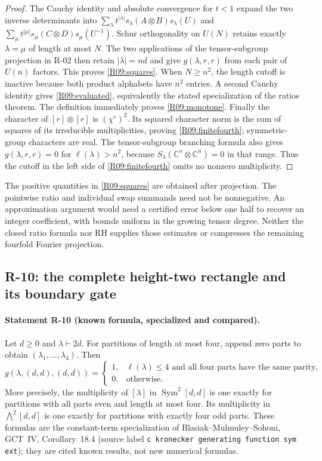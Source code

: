 \begin{proof}
The Cauchy identity and absolute convergence for $t<1$ expand the two
inverse determinants into
$\sum_\lambda t^{|\lambda|}s_\lambda(A\otimes B)s_\lambda(U)$
and
$\sum_\mu t^{|\mu|}s_\mu(C\otimes D)s_\mu(U^{-1})$.
Schur orthogonality on $U(N)$ retains exactly $\lambda=\mu$ of
length at most $N$. The two applications of the tensor-subgroup
projection in R-02 then retain $|\lambda|=nd$ and give
$g(\lambda,r,r)$ from each pair of $U(n)$ factors. This proves
\eqref{R09:squares}. When $N\geq n^2$, the length cutoff is
inactive because both product alphabets have $n^2$ entries. A second
Cauchy identity gives \eqref{R09:evaluated}, equivalently the stated
specialization of the ratios theorem. The definition immediately
proves \eqref{R09:monotone}. Finally the character of
$[r]\otimes[r]$ is $(\chi^r)^2$. Its squared character norm is
the sum of squares of its irreducible multiplicities, proving
\eqref{R09:finitefourth}; symmetric-group characters are real.
The tensor-subgroup branching formula also gives
$g(\lambda,r,r)=0$ for $\ell(\lambda)>n^2$, because
$S_\lambda(\mathbb C^n\otimes\mathbb C^n)=0$ in that range.
Thus the cutoff in the left side of \eqref{R09:finitefourth}
omits no nonzero multiplicity.
\end{proof}

The positive quantities in \eqref{R09:squares} are obtained after
projection. The pointwise ratio and individual swap summands need
not be nonnegative. An approximation argument would need a
certified error below one half to recover an integer coefficient,
with bounds uniform in the growing tensor degree. Neither the
closed ratio formula nor RH supplies those estimates or compresses
the remaining fourfold Fourier projection.

\subsection{R-10: the complete height-two rectangle and its boundary gate}

\paragraph{Statement R-10 (known formula, specialized and compared).}
Let $d\geq0$ and $\lambda\vdash2d$. For partitions of length at
most four, append zero parts to obtain $(\lambda_1,\ldots,\lambda_4)$.
Then
\begin{equation}\label{R10:rectangle}
g(\lambda,(d,d),(d,d))=
\begin{cases}
1,&\ell(\lambda)\leq4\text{ and all four parts have the same parity},\\
0,&\text{otherwise}.
\end{cases}
\end{equation}
More precisely, the multiplicity of $[\lambda]$ in
$\operatorname{Sym}^2[d,d]$ is one exactly for partitions with all
parts even and length at most four. Its multiplicity in
$\bigwedge^2[d,d]$ is one exactly for partitions with exactly four
odd parts. These formulas are the constant-term specialization of
Blasiak--Mulmuley--Sohoni, GCT~IV, Corollary~18.4
(source label \texttt{c kronecker generating function sym ext});
they are cited known results, not new numerical formulas.

